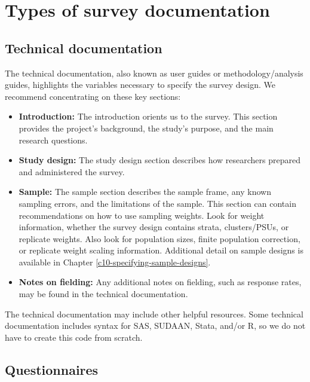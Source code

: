 \documentclass[
]{krantz}
\providecommand{\tightlist}{%
  \setlength{\itemsep}{0pt}\setlength{\parskip}{0pt}}
\begin{document}
\hypertarget{types-of-survey-documentation}{%
\section{Types of survey documentation}\label{types-of-survey-documentation}}

\hypertarget{technical-documentation}{%
\subsection{Technical documentation}\label{technical-documentation}}

The technical documentation, also known as user guides or methodology/analysis guides, highlights the variables necessary to specify the survey design. We recommend concentrating on these key sections:

\begin{itemize}
\tightlist
\item
  \textbf{Introduction:} The introduction orients us to the survey. This section provides the project's background, the study's purpose, and the main research questions.
\item
  \textbf{Study design:} The study design section describes how researchers prepared and administered the survey.
\item
  \textbf{Sample:} The sample section describes the sample frame, any known sampling errors, and the limitations of the sample. This section can contain recommendations on how to use sampling weights. Look for weight information, whether the survey design contains strata, clusters/PSUs, or replicate weights. Also look for population sizes, finite population correction, or replicate weight scaling information. Additional detail on sample designs is available in Chapter \ref{c10-specifying-sample-designs}.
\item
  \textbf{Notes on fielding:} Any additional notes on fielding, such as response rates, may be found in the technical documentation.
\end{itemize}

The technical documentation may include other helpful resources. Some technical documentation includes syntax for SAS, SUDAAN, Stata, and/or R, so we do not have to create this code from scratch.

\hypertarget{questionnaires}{%
\subsection{Questionnaires}\label{questionnaires}}
\end{document}
